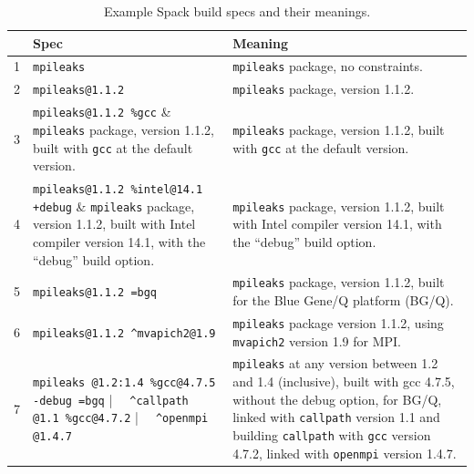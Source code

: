 

\begin{table}\centering
\begin{tabular}{|r|p{2.4in}|p{4in}|}
\hline
& {\bf Spec} & {\bf Meaning} \\
\hline
\hline
1&\small\verb|mpileaks|                         & \small {\tt mpileaks} package, no constraints. \\\hline
2&\small\verb|mpileaks@1.1.2|                   & \small {\tt mpileaks} package, version 1.1.2. \\\hline
3&\small\verb|mpileaks@1.1.2 %gcc|              & \small {\tt mpileaks} package, version 1.1.2, built with {\tt gcc} at the default version. \\\hline
4&\small\verb|mpileaks@1.1.2 %intel@14.1 +debug| & \small {\tt mpileaks} package, version 1.1.2, built with Intel compiler version 14.1, \newline with the ``debug'' build option. \\\hline
5&\small\verb|mpileaks@1.1.2 =bgq|              & \small {\tt mpileaks} package, version 1.1.2, built for the Blue Gene/Q platform (BG/Q). \\\hline
6&\small\verb|mpileaks@1.1.2 ^mvapich2@1.9|     & \small {\tt mpileaks} package version 1.1.2, using {\tt mvapich2}  version 1.9 for MPI. \\\hline
7&\small\verb|mpileaks @1.2:1.4 %gcc@4.7.5 -debug =bgq| \newline
      \verb|  ^callpath @1.1 %gcc@4.7.2| \newline
      \verb|  ^openmpi @1.4.7|                & \small%
      {\tt mpileaks} at any version between 1.2 and 1.4 (inclusive), built with gcc 4.7.5, 
      without the debug option, for BG/Q, linked with {\tt callpath} version 1.1
      and building {\tt callpath} with {\tt gcc} version 4.7.2, linked with {\tt openmpi} version 1.4.7.    \\
\hline
\end{tabular}
\caption{
	Example Spack build specs and their meanings.
	\label{tab:specs}
}
\end{table}


